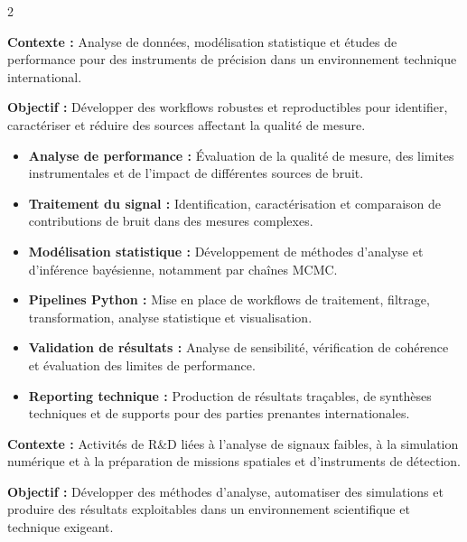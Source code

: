 \documentclass[8pt,a4paper,ragged2e,withhyper]{../_shared/altacv}
\begin{document}
\begin{paracol}{2}
\divider


\textbf{Contexte :} Analyse de données, modélisation statistique et études de performance pour des instruments de précision dans un environnement technique international.

\textbf{Objectif :} Développer des workflows robustes et reproductibles pour identifier, caractériser et réduire des sources affectant la qualité de mesure.

\begin{itemize}
  \item \textbf{Analyse de performance :} Évaluation de la qualité de mesure, des limites instrumentales et de l’impact de différentes sources de bruit.
  \item \textbf{Traitement du signal :} Identification, caractérisation et comparaison de contributions de bruit dans des mesures complexes.
  \item \textbf{Modélisation statistique :} Développement de méthodes d’analyse et d’inférence bayésienne, notamment par chaînes MCMC.
  \item \textbf{Pipelines Python :} Mise en place de workflows de traitement, filtrage, transformation, analyse statistique et visualisation.
  \item \textbf{Validation de résultats :} Analyse de sensibilité, vérification de cohérence et évaluation des limites de performance.
  \item \textbf{Reporting technique :} Production de résultats traçables, de synthèses techniques et de supports pour des parties prenantes internationales.
\end{itemize}

\divider


\textbf{Contexte :} Activités de R\&D liées à l’analyse de signaux faibles, à la simulation numérique et à la préparation de missions spatiales et d’instruments de détection.

\textbf{Objectif :} Développer des méthodes d’analyse, automatiser des simulations et produire des résultats exploitables dans un environnement scientifique et technique exigeant.


\end{paracol}
\end{document}
